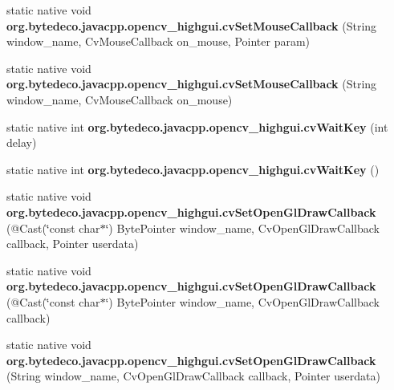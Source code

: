 \begin{DoxyCompactItemize}
\item 
\mbox{\label{group__highgui__c_ga776d647e79abda6671cb3d7c165b326b}} 
static native void {\bfseries org.\+bytedeco.\+javacpp.\+opencv\+\_\+highgui.\+cv\+Set\+Mouse\+Callback} (String window\+\_\+name, Cv\+Mouse\+Callback on\+\_\+mouse, Pointer param)
\item 
\mbox{\label{group__highgui__c_gadda4a42f4bb38d5650acb5471ff485e6}} 
static native void {\bfseries org.\+bytedeco.\+javacpp.\+opencv\+\_\+highgui.\+cv\+Set\+Mouse\+Callback} (String window\+\_\+name, Cv\+Mouse\+Callback on\+\_\+mouse)
\item 
\mbox{\label{group__highgui__c_ga2114ce39abe6978d3c71f0bdf941dd40}} 
static native int {\bfseries org.\+bytedeco.\+javacpp.\+opencv\+\_\+highgui.\+cv\+Wait\+Key} (int delay)
\item 
\mbox{\label{group__highgui__c_ga1b2b37555c8c707837c8c53d1c928942}} 
static native int {\bfseries org.\+bytedeco.\+javacpp.\+opencv\+\_\+highgui.\+cv\+Wait\+Key} ()
\item 
\mbox{\label{group__highgui__c_ga161e609ae6dee263ae369300ac24e828}} 
static native void {\bfseries org.\+bytedeco.\+javacpp.\+opencv\+\_\+highgui.\+cv\+Set\+Open\+Gl\+Draw\+Callback} (@Cast(\char`\"{}const char$\ast$\char`\"{}) Byte\+Pointer window\+\_\+name, Cv\+Open\+Gl\+Draw\+Callback callback, Pointer userdata)
\item 
\mbox{\label{group__highgui__c_gaa997ace2088942f916c112a90afe7bb9}} 
static native void {\bfseries org.\+bytedeco.\+javacpp.\+opencv\+\_\+highgui.\+cv\+Set\+Open\+Gl\+Draw\+Callback} (@Cast(\char`\"{}const char$\ast$\char`\"{}) Byte\+Pointer window\+\_\+name, Cv\+Open\+Gl\+Draw\+Callback callback)
\item 
\mbox{\label{group__highgui__c_ga0e6eb7f5a781bc82ad1b2f9d50bbce93}} 
static native void {\bfseries org.\+bytedeco.\+javacpp.\+opencv\+\_\+highgui.\+cv\+Set\+Open\+Gl\+Draw\+Callback} (String window\+\_\+name, Cv\+Open\+Gl\+Draw\+Callback callback, Pointer userdata)
\item 
\mbox{\label{group__highgui__c_gaab3dcf3e002256565b99ae935bb8ed9d}} 

\end{DoxyCompactItemize}
